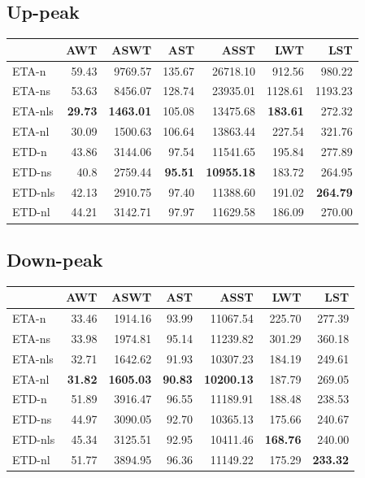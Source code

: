 \documentclass{UoYCSproject}
\begin{document}
\begin{appendices}
\subsection{Up-peak}
\begin{tabular}{l | r r r r r r}
	& AWT & ASWT & AST & ASST & LWT & LST \\
	\hline
    ETA-n & 59.43 & 9769.57 & 135.67 & 26718.10 & 912.56 & 980.22 \\
    ETA-ns & 53.63 & 8456.07 & 128.74 & 23935.01 & 1128.61 & 1193.23 \\
    ETA-nls & \textbf{29.73} & \textbf{1463.01} & 105.08 & 13475.68 & \textbf{183.61} & 272.32 \\
    ETA-nl & 30.09 & 1500.63 & 106.64 & 13863.44 & 227.54 & 321.76 \\
    ETD-n & 43.86 & 3144.06 & 97.54 & 11541.65 & 195.84 & 277.89 \\
    ETD-ns & 40.8 & 2759.44 & \textbf{95.51} & \textbf{10955.18} & 183.72 & 264.95 \\
    ETD-nls & 42.13 & 2910.75 & 97.40 & 11388.60 & 191.02 & \textbf{264.79} \\
    ETD-nl & 44.21 & 3142.71 & 97.97 & 11629.58 & 186.09 & 270.00
\end{tabular}

\subsection{Down-peak}
\begin{tabular}{l | r r r r r r}
	& AWT & ASWT & AST & ASST & LWT & LST \\
	\hline
    ETA-n & 33.46 & 1914.16 & 93.99 & 11067.54 & 225.70 & 277.39 \\
    ETA-ns & 33.98 & 1974.81 & 95.14 & 11239.82 & 301.29 & 360.18 \\
    ETA-nls & 32.71 & 1642.62 & 91.93 & 10307.23 & 184.19 & 249.61 \\
    ETA-nl & \textbf{31.82} & \textbf{1605.03} & \textbf{90.83} & \textbf{10200.13} & 187.79 & 269.05 \\
    ETD-n & 51.89 & 3916.47 & 96.55 & 11189.91 & 188.48 & 238.53 \\
    ETD-ns & 44.97 & 3090.05 & 92.70 & 10365.13 & 175.66 & 240.67 \\
    ETD-nls & 45.34 & 3125.51 & 92.95 & 10411.46 & \textbf{168.76} & 240.00 \\
    ETD-nl & 51.77 & 3894.95 & 96.36 & 11149.22 & 175.29 & \textbf{233.32}
\end{tabular}


\end{appendices}
\end{document}
